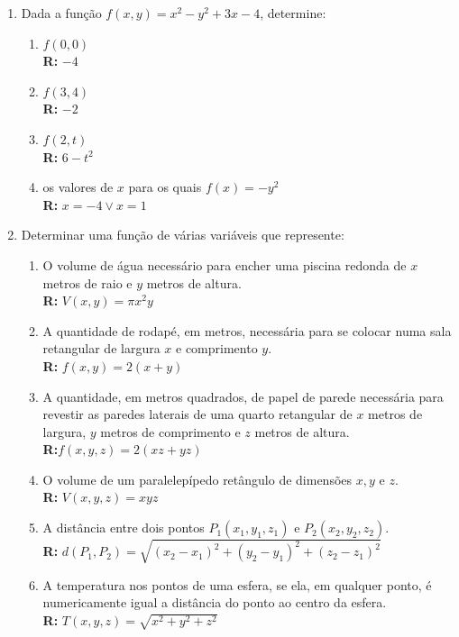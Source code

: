\documentclass[oneside,a4paper,12pt]{article}
\begin{document}
\begin{enumerate}

	\item Dada a função $f(x,y) = x^2-y^2+3x-4$, determine:
        \begin{enumerate}
            \item $f(0,0)$\\{\bf R:} $-4$
            \item $f(3,4)$\\{\bf R:} $-2$
            \item $f(2,t)$\\{\bf R:} $6-t^2$
            \item os valores de $x$ para os quais $f(x)=-y^2$\\{\bf R:} $x=-4 \lor x = 1$ 
        \end{enumerate}
	\item Determinar uma função de várias variáveis que represente:
        \begin{enumerate}
            \item O volume de água necessário para encher uma piscina redonda de $x$ metros de raio e $y$ metros de altura.\\{\bf R:} $V(x,y) = \pi x^2y$
            \item A quantidade de rodapé, em metros, necessária para se colocar numa sala retangular de largura $x$ e comprimento $y$. \\{\bf R:} $f(x,y) = 2(x+y)$
            \item A quantidade, em metros quadrados, de papel de parede necessária para revestir as paredes laterais de uma quarto retangular de $x$ metros de largura, $y$ metros de comprimento e $z$ metros de altura. \\{\bf R:}$f(x,y,z) = 2(xz+yz)$
            \item O volume de um paralelepípedo retângulo de dimensões $x,y$ e $z$. \\{\bf R:} $V(x,y,z) = xyz$
            \item A distância entre dois pontos $P_1(x_1,y_1,z_1)$ e $P_2(x_2,y_2,z_2)$. \\{\bf R:} $d(P_1,P_2) = \sqrt{(x_2-x_1)^2+(y_2-y_1)^2+(z_2-z_1)^2}$ 
            \item A temperatura nos pontos de uma esfera, se ela, em qualquer ponto, é numericamente igual a distância do ponto ao centro da esfera. \\{\bf R:} $T(x,y,z) = \sqrt{x^2+y^2+z^2}$
        \end{enumerate}

\end{enumerate}
\end{document}
